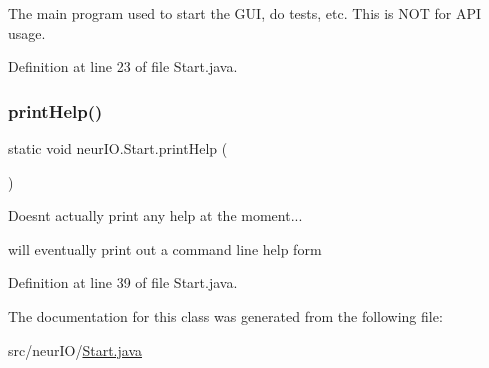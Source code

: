 The main program used to start the G\+UI, do tests, etc. This is N\+OT for A\+PI usage. 

Definition at line 23 of file Start.\+java.

\mbox{\label{classneur_i_o_1_1_start_ae057e60dad95a9bd37e41c860cae2fab}} 
\subsubsection{\texorpdfstring{print\+Help()}{printHelp()}}
{\footnotesize\ttfamily static void neur\+I\+O.\+Start.\+print\+Help (\begin{DoxyParamCaption}{ }\end{DoxyParamCaption})\hspace{0.3cm}{\ttfamily [static]}}

Doesn\textquotesingle{}t actually print any help at the moment...

will eventually print out a command line help form 

Definition at line 39 of file Start.\+java.



The documentation for this class was generated from the following file\+:\begin{DoxyCompactItemize}
\item 
src/neur\+I\+O/\hyperlink{_start_8java}{Start.\+java}\end{DoxyCompactItemize}
